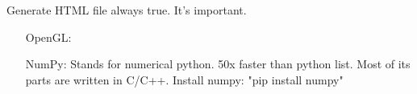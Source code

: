 \documentclass{article}
\begin{document}
    Generate HTML file always true. It's important.

    \begin{itemize}
        \item[OpenGL: ]
        \item[NumPy: ] Stands for numerical python. 50x faster than python list. Most of its parts are written in C/C++. Install numpy: "pip install numpy"
    \end{itemize}
\end{document}
